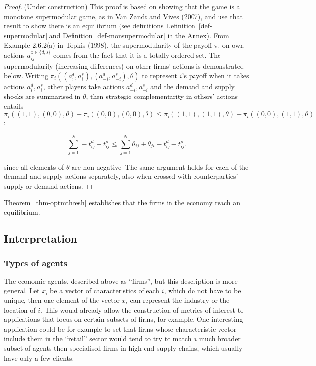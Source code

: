 \documentclass[
]{article}
\theoremstyle{definition}
\theoremstyle{plain}
\theoremstyle{remark}
\begin{document}
\begin{proof}
(Under construction) This proof is based on showing that the game is a
monotone supermodular game, as in Van Zandt and Vives (2007), and use
that result to show there is an equilibrium (see definitions
Definition~\ref{def-supermodular} and
Definition~\ref{def-monsupermodular} in the Annex). From Example
2.6.2(a) in Topkis (1998), the supermodularity of the payoff \(\pi_i\)
on own actions \(a_{ij}^{z \in \{d, s\}}\) comes from the fact that it
is a totally ordered set. The supermodularity (increasing differences)
on other firms' actions is demonstrated below. Writing
\(\pi_i((a_i^d, a_i^s),(a_{-i}^d, a_{-i}^s), \theta)\) to represent
\(i\)'s payoff when it takes actions \(a_i^d, a_i^s\), other players
take actions \(a_{-i}^d, a_{-i}^s\) and the demand and supply shocks are
summarised in \(\theta\), then strategic complementarity in others'
actions entails
\(\pi_i((1,1), (0,0), \theta) - \pi_i((0,0), (0,0), \theta) \leq \pi_i((1,1), (1,1), \theta) - \pi_i((0,0), (1,1), \theta)\):

\[
\sum_{j=1}^N -t_{ij}^d -t_{ij}^s \leq \sum_{j=1}^N \theta_{ij} + \theta_{ji} - t_{ij}^d - t_{ij}^s,
\]

since all elements of \(\theta\) are non-negative. The same argument
holds for each of the demand and supply actions separately, also when
crossed with counterparties' supply or demand actions.
\end{proof}

Theorem~\ref{thm-optmthresh} establishes that the firms in the economy
reach an equilibrium.

\subsection{Interpretation}\label{sec-interpretation}

\subsubsection{Types of agents}\label{types-of-agents}

The economic agents, described above as ``firms'', but this description
is more general. Let \(x_i\) be a vector of characteristics of each
\(i\), which do not have to be unique, then one element of the vector
\(x_i\) can represent the industry or the location of \(i\). This would
already allow the construction of metrics of interest to applications
that focus on certain subsets of firms, for example. One interesting
application could be for example to set that firms whose characteristic
vector include them in the ``retail'' sector would tend to try to match
a much broader subset of agents then specialised firms in high-end
supply chains, which usually have only a few clients.
\end{document}
